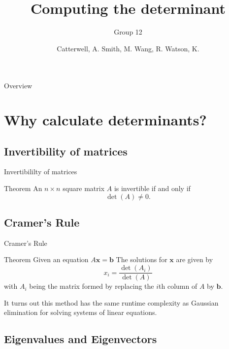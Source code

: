 \documentclass{beamer}
\title{Computing the determinant}
\subtitle{Group 12}
\author{Catterwell, A. \quad Smith, M. \quad Wang, R. \quad Watson, K.}
\institute{University of Edinburgh}
\begin{document}
\begin{frame}
    \maketitle
\end{frame}

\begin{frame}{Overview}
    \tableofcontents
\end{frame}

\section{Why calculate determinants?}

\subsection{Invertibility of matrices}
\begin{frame}{Invertibililty of matrices}

    \begin{block}{Theorem}
        An $n \times n$ square matrix $A$ is invertible if and only if
        \[
            \det(A) \neq 0.
        \]
    \end{block}

\end{frame}

\subsection{Cramer's Rule}

\begin{frame}{Cramer's Rule}

    \begin{block}{Theorem}
        Given an equation $A\mathbf{x} = \mathbf{b}$
        The solutions for $\mathbf{x}$ are given by
        \[
            x_i = \frac{\det(A_i)}{\det(A)}
        \]
        with $A_i$ being the matrix formed by replacing the $i$th column
        of $A$ by $\mathbf{b}$.
    \end{block}


    It turns out this method has the same runtime complexity as Gaussian elimination for solving
    systems of linear equations.

\end{frame}

\subsection{Eigenvalues and Eigenvectors}
\end{document}
